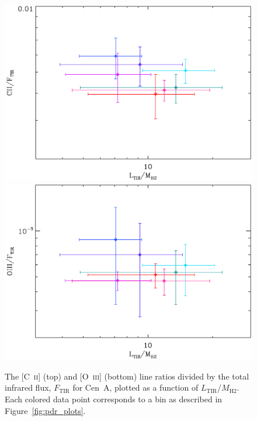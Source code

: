 \begin{figure}
\centering
\includegraphics[width=0.9\columnwidth]{ch4/CenA_CIIonFtir_LtironMH2_plot_v1}
\includegraphics[width=0.9\columnwidth]{ch4/CenA_OIIIonFtir_LtironMH2_plot_v1}
\caption[\mbox{[C~\textsc{ii}]/$F_{\mathrm{TIR}}$} and \mbox{[O~\textsc{iii}]/$F_{\mathrm{TIR}}$} line ratios as a function of \mbox{$L_{\mathrm{TIR}}$/$M_{\mathrm{H}2}$} for Centaurus~A]{The [C~\textsc{ii}] (top) and [O~\textsc{iii}] (bottom) line ratios divided by the total infrared flux, $F_{\mathrm{TIR}}$ for Cen~A, plotted as a function of $L_{\mathrm{TIR}}$/$M_{\mathrm{H}2}$.  Each colored data point corresponds to a bin as described in Figure~\ref{fig:pdr_plots}.}
\label{fig:sfr}
\end{figure}

